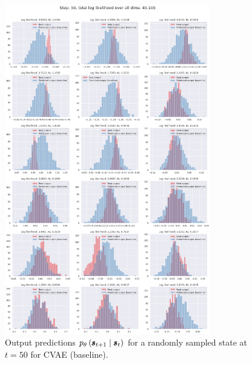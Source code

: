 \begin{figure}
    \centering
    \includegraphics[width=0.8\textwidth]{img/windyslope/output/windyslope_output_baseline_dist_10_step50.png}
    \caption{Output predictions $\ptheta \protect\given*{\vns}{\vs}$ for a randomly sampled state at $t=50$ for CVAE (baseline).}
    \label{fig:output_distribution_step50_posvel_baseline}
\end{figure}

